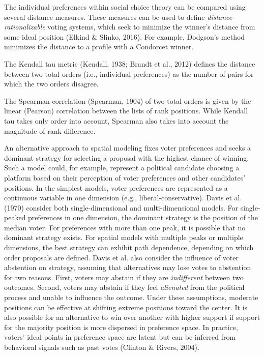 The individual preferences within social choice theory can be compared using several distance measures. These measures can be used to define {\em distance-rationalizable} voting systems, which seek to minimize the winner's distance from some ideal position (Elkind \& Slinko, 2016). For example, Dodgson's method minimizes the distance to a profile with a Condorcet winner.

The Kendall tau metric (Kendall, 1938; Brandt et al., 2012) defines the distance between two total orders (i.e., individual preferences) as the number of pairs for which the two orders disagree.

The Spearman correlation (Spearman, 1904) of two total orders is given by the linear (Pearson) correlation between the lists of rank positions. While Kendall tau takes only order into account, Spearman also takes into account the magnitude of rank difference.

An alternative approach to spatial modeling fixes voter preferences and seeks a dominant strategy for selecting a proposal with the highest chance of winning. Such a model could, for example, represent a political candidate choosing a platform based on their perception of voter preferences and other candidates' positions. In the simplest models, voter preferences are represented as a continuous variable in one dimension (e.g., liberal-conservative). Davis et al. (1970) consider both single-dimensional and multi-dimensional models. For single-peaked preferences in one dimension, the dominant strategy is the position of the median voter. For preferences with more than one peak, it is possible that no dominant strategy exists. For spatial models with multiple peaks or multiple dimensions, the best strategy can exhibit path dependence, depending on which order proposals are defined. Davis et al. also consider the influence of voter abstention on strategy, assuming that alternatives may lose votes to abstention for two reasons. First, voters may abstain if they are {\em indifferent} between two outcomes. Second, voters may abstain if they feel {\em alienated} from the political process and unable to influence the outcome. Under these assumptions, moderate positions can be effective at shifting extreme positions toward the center. It is also possible for an alternative to win over another with higher support if support for the majority position is more dispersed in preference space. In practice, voters' ideal points in preference space are latent but can be inferred from behavioral signals such as past votes (Clinton \& Rivers, 2004).

